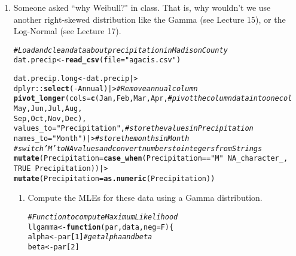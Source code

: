 \documentclass{article}\usepackage[]{graphicx}\usepackage[]{xcolor}
\makeatletter
\newcommand{\hlnum}[1]{\textcolor[rgb]{0.686,0.059,0.569}{#1}}%
\newcommand{\hlsng}[1]{\textcolor[rgb]{0.192,0.494,0.8}{#1}}%
\newcommand{\hlcom}[1]{\textcolor[rgb]{0.678,0.584,0.686}{\textit{#1}}}%
\newcommand{\hlopt}[1]{\textcolor[rgb]{0,0,0}{#1}}%
\newcommand{\hldef}[1]{\textcolor[rgb]{0.345,0.345,0.345}{#1}}%
\newcommand{\hlkwa}[1]{\textcolor[rgb]{0.161,0.373,0.58}{\textbf{#1}}}%
\newcommand{\hlkwb}[1]{\textcolor[rgb]{0.69,0.353,0.396}{#1}}%
\newcommand{\hlkwc}[1]{\textcolor[rgb]{0.333,0.667,0.333}{#1}}%
\newcommand{\hlkwd}[1]{\textcolor[rgb]{0.737,0.353,0.396}{\textbf{#1}}}%
\newenvironment{kframe}{%
 \def\at@end@of@kframe{}%
 \ifinner\ifhmode%
  \def\at@end@of@kframe{\end{minipage}}%
  \begin{minipage}{\columnwidth}%
 \fi\fi%
 \def\FrameCommand##1{\hskip\@totalleftmargin \hskip-\fboxsep
 \colorbox{shadecolor}{##1}\hskip-\fboxsep
     \hskip-\linewidth \hskip-\@totalleftmargin \hskip\columnwidth}%
 \MakeFramed {\advance\hsize-\width
   \@totalleftmargin\z@ \linewidth\hsize
   \@setminipage}}%
 {\par\unskip\endMakeFramed%
 \at@end@of@kframe}
\newenvironment{knitrout}{}{} %
\makeatother
\begin{document}
\begin{enumerate}
  \item Someone asked ``why Weibull?" in class. That is, why wouldn't we use 
  another right-skewed distribution like the Gamma (see Lecture 15), or
  the Log-Normal (see Lecture 17).
  
\begin{knitrout}
\color{fgcolor}\begin{kframe}
\begin{alltt}
\hlcom{# Load and clean data about precipitation in Madison County}
\hldef{dat.precip} \hlkwb{<-} \hlkwd{read_csv}\hldef{(}\hlkwc{file} \hldef{=} \hlsng{"agacis.csv"}\hldef{)}

\hldef{dat.precip.long} \hlkwb{<-} \hldef{dat.precip |>}
\hldef{dplyr}\hlopt{::}\hlkwd{select}\hldef{(}\hlopt{-}\hldef{Annual) |>}                   \hlcom{# Remove annual column }
\hlkwd{pivot_longer}\hldef{(}\hlkwc{cols} \hldef{=} \hlkwd{c}\hldef{(Jan, Feb, Mar, Apr,}   \hlcom{# pivot the column data into one col}
                      \hldef{May, Jun, Jul, Aug,}
                      \hldef{Sep, Oct, Nov, Dec),}
             \hlkwc{values_to} \hldef{=} \hlsng{"Precipitation"}\hldef{,}   \hlcom{# store the values in Precipitation}
             \hlkwc{names_to} \hldef{=} \hlsng{"Month"}\hldef{) |>}         \hlcom{# store the months in Month}
\hlcom{#switch 'M' to NA values and convert numbers to integers from Strings}
\hlkwd{mutate}\hldef{(}\hlkwc{Precipitation} \hldef{=} \hlkwd{case_when}\hldef{(Precipitation} \hlopt{==} \hlsng{"M"} \hlopt{~} \hlnum{NA_character_}\hldef{,}
                                 \hlnum{TRUE}                 \hlopt{~} \hldef{Precipitation))|>}
\hlkwd{mutate}\hldef{(}\hlkwc{Precipitation} \hldef{=} \hlkwd{as.numeric}\hldef{(Precipitation))}
\end{alltt}
\end{kframe}
\end{knitrout}
\begin{enumerate}
    \item Compute the MLEs for these data using a Gamma distribution.
\begin{knitrout}
\color{fgcolor}\begin{kframe}
\begin{alltt}
\hlcom{#Function to compute Maximum Likelihood}
\hldef{llgamma} \hlkwb{<-} \hlkwa{function}\hldef{(}\hlkwc{par}\hldef{,} \hlkwc{data}\hldef{,} \hlkwc{neg} \hldef{= F)\{}
  \hldef{alpha} \hlkwb{<-} \hldef{par[}\hlnum{1}\hldef{]} \hlcom{#get alpha and beta}
  \hldef{beta} \hlkwb{<-} \hldef{par[}\hlnum{2}\hldef{]}


\end{alltt}
\end{kframe}
\end{knitrout}
\end{enumerate}
\end{enumerate}
\end{document}
